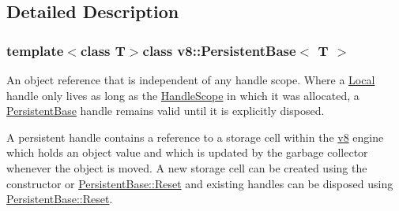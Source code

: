 \subsection{Detailed Description}
\subsubsection*{template$<$class T$>$class v8\-::\-Persistent\-Base$<$ T $>$}

An object reference that is independent of any handle scope. Where a \hyperlink{classv8_1_1Local}{Local} handle only lives as long as the \hyperlink{classv8_1_1HandleScope}{Handle\-Scope} in which it was allocated, a \hyperlink{classv8_1_1PersistentBase}{Persistent\-Base} handle remains valid until it is explicitly disposed.

A persistent handle contains a reference to a storage cell within the \hyperlink{namespacev8}{v8} engine which holds an object value and which is updated by the garbage collector whenever the object is moved. A new storage cell can be created using the constructor or \hyperlink{classv8_1_1PersistentBase_a174bb1e45b18fd4eeaee033622825bb8}{Persistent\-Base\-::\-Reset} and existing handles can be disposed using \hyperlink{classv8_1_1PersistentBase_a174bb1e45b18fd4eeaee033622825bb8}{Persistent\-Base\-::\-Reset}. 

